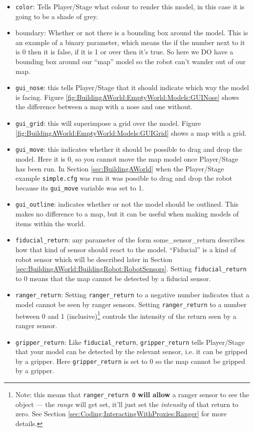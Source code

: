 \documentclass[a4paper]{report}
\newcommand{\plst}{Player/Stage\xspace}
\begin{document}
\begin{itemize}
\item \verb|color|: Tells \plst what colour to render this model, in this case it is going to be a shade of grey. 
\item boundary: Whether or not there is a bounding box around the model. This is an example of a binary parameter, which means the if the number next to it is 0 then it is false, if it is 1 or over then it's true. So here we DO have a bounding box around our ``map'' model so the robot can't wander out of our map.
\item \verb|gui_nose|: this tells \plst that it should indicate which way the model is facing. Figure \ref{fig:BuildingAWorld:EmptyWorld:Models:GUINose} shows the difference between a map with a nose and one without.
\item \verb|gui_grid|: this will superimpose a grid over the model. Figure \ref{fig:BuildingAWorld:EmptyWorld:Models:GUIGrid} shows a map with a grid.
\item \verb|gui_move|: this indicates whether it should be possible to drag and drop the model. Here it is 0, so you cannot move the map model once \plst has been run. In Section \ref{sec:BuildingAWorld} when the \plst example \verb|simple.cfg| was run it was possible to drag and drop the robot because its \verb|gui_move| variable was set to 1.
\item \verb|gui_outline|: indicates whether or not the model should be outlined. This makes no difference to a map, but it can be useful when making models of items within the world.
\item \verb|fiducial_return|: any parameter of the form some\_sensor\_return describes how that kind of sensor should react to the model. ``Fiducial'' is a kind of robot sensor which will be described later in Section \ref{sec:BuildingAWorld:BuildingRobot:RobotSensors}. Setting \verb|fiducial_return| to 0 means that the map cannot be detected by a fiducial sensor.
\item \verb|ranger_return|: Setting \verb|ranger_return| to a negative
      number indicates that a model cannot be seen by ranger sensors.
      Setting \verb|ranger_return| to a number between 0 and 1
      (inclusive)\footnote{Note: this means that {\tt ranger\_return 0}  
      {\bf will allow} a ranger sensor to see the object --- the {\em
      range} will get set, it'll just set the {\em intensity} of that return
      to zero.  See Section \ref{sec:Coding:InteractingWithProxies:Ranger}
      for more details.}
      controls the intensity of the return seen by a ranger sensor.
\item \verb|gripper_return|: Like \verb|fiducial_return|, \verb|gripper_return| tells \plst that your model can be detected by the relevant sensor, i.e. it can be gripped by a gripper. Here \verb|gripper_return| is set to 0 so the map cannot be gripped by a gripper. 
\end{itemize}
\end{document}
